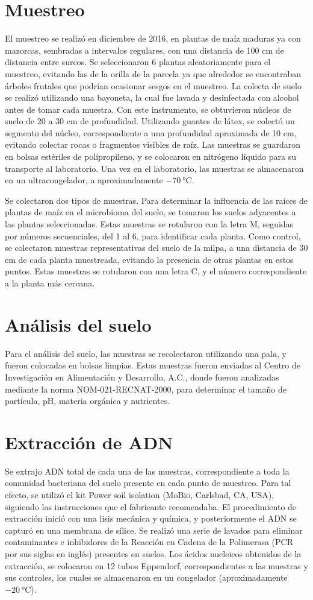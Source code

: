\documentclass[12pt,letterpaper,oneside]{report}
\begin{document}
\section{Muestreo}
El muestreo se realizó en diciembre de 2016, en plantas de maíz maduras ya con mazorcas, sembradas a intervalos regulares, con una distancia de 100 cm de distancia entre surcos. Se seleccionaron 6 plantas aleatoriamente para el muestreo, evitando las de la orilla de la parcela ya que alrededor se encontraban árboles frutales  que podrían ocasionar sesgos en el muestreo. La colecta de suelo se realizó utilizando una bayoneta, la cual fue lavada y desinfectada con alcohol antes de tomar cada muestra. Con este instrumento, se obtuvieron núcleos de suelo de 20 a 30 cm de profundidad. Utilizando guantes de látex, se colectó un segmento del núcleo, correspondiente a una profundidad aproximada de 10 cm, evitando colectar rocas o fragmentos visibles de raíz.  Las muestras se guardaron en bolsas estériles de polipropileno, y se colocaron en nitrógeno líquido para su transporte al laboratorio. Una vez en el laboratorio, las muestras se almacenaron en un ultracongelador, a aproximadamente  $\SI{-70}{\degreeCelsius}$.
\par
Se colectaron dos tipos de muestras. Para determinar la influencia de las raíces de plantas de maíz en el microbioma del suelo, se tomaron los suelos adyacentes a las plantas seleccionadas. Estas muestras se rotularon con la letra M, seguidas por números secuenciales, del 1 al 6, para identificar cada planta. Como control, se colectaron muestras representativas del suelo de la milpa, a una distancia de 30 cm de cada planta muestreada, evitando la presencia de otras plantas en estos puntos. Estas muestras se rotularon con una letra C, y el número correspondiente a la planta más cercana.
\section{Análisis del suelo}
Para el análisis del suelo, las muestras se recolectaron utilizando una pala, y fueron colocadas en bolsas limpias. Estas muestras fueron enviadas al Centro de Investigación en Alimentación y Desarrollo, A.C., donde fueron analizadas mediante la norma NOM-021-RECNAT-2000, para determinar el tamaño de partícula, pH, materia orgánica y nutrientes.
\section{Extracción de ADN}
Se extrajo ADN total de cada una de las muestras, correspondiente a toda la comunidad bacteriana del suelo presente en cada punto de muestreo. Para tal efecto, se utilizó el kit Power soil isolation (MoBio, Carlsbad, CA, USA), siguiendo las instrucciones que el fabricante recomendaba. El procedimiento de extracción inició con una lisis mecánica y química, y posteriormente el ADN se capturó en una membrana de sílice. Se realizó una serie de lavados para eliminar contaminantes e inhibidores de la Reacción en Cadena de la Polimerasa (PCR por sus siglas en inglés) presentes en suelos. Los ácidos nucleicos obtenidos de la extracción, se colocaron en 12 tubos Eppendorf, correspondientes a las muestras y sus controles, los cuales se almacenaron en un congelador (aproximadamente $\SI{-20}{\degreeCelsius}$).
\newpage
\end{document}
